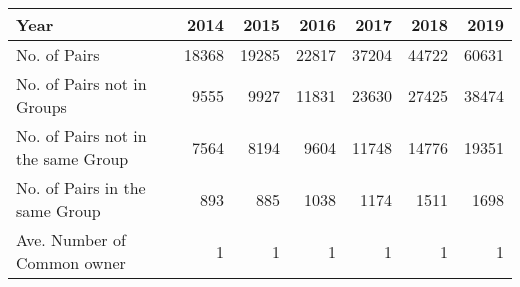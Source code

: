 \begin{tabular}{lrrrrrr}
\toprule
Year &   2014 &   2015 &   2016 &   2017 &   2018 &   2019 \\
\midrule
No. of Pairs                       &  18368 &  19285 &  22817 &  37204 &  44722 &  60631 \\
No. of Pairs not in Groups         &   9555 &   9927 &  11831 &  23630 &  27425 &  38474 \\
No. of Pairs not in the same Group &   7564 &   8194 &   9604 &  11748 &  14776 &  19351 \\
No. of Pairs in the same Group     &    893 &    885 &   1038 &   1174 &   1511 &   1698 \\
Ave. Number of Common owner        &      1 &      1 &      1 &      1 &      1 &      1 \\
\bottomrule
\end{tabular}
